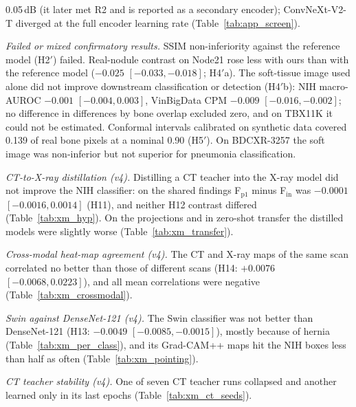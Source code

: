 \begin{description}
 0.05\,dB (it later met R2 and is reported as a secondary encoder); ConvNeXt-V2-T diverged at the full encoder learning rate
 (Table~\ref{tab:app_screen}).
\item[N9] \emph{Failed or mixed confirmatory results.}
 SSIM non-inferiority against the reference model (H2$'$) failed.
 Real-nodule contrast on Node21 rose less with ours than with the reference model ($-0.025$ $[-0.033,-0.018]$; H4$'$a).
 The soft-tissue image used alone did not improve downstream classification or detection (H4$'$b): NIH macro-AUROC $-0.001$
 $[-0.004,0.003]$, VinBigData CPM $-0.009$ $[-0.016,-0.002]$; no difference in differences by bone overlap excluded zero, and on TBX11K it could
 not be estimated.
 Conformal intervals calibrated on synthetic data covered 0.139 of real bone pixels at a nominal 0.90 (H5$'$).
 On BDCXR-3257 the soft image was non-inferior but not superior for pneumonia classification.
\item[N10] \emph{CT-to-X-ray distillation (v4).} Distilling a CT teacher into the X-ray model did not improve the NIH classifier: on the
 shared findings F$_\mathrm{p1}$ minus F$_\mathrm{in}$ was $-0.0001$ $[-0.0016,0.0014]$ (H11), and neither H12 contrast differed
 (Table~\ref{tab:xm_hyp}). On the projections and in zero-shot transfer the distilled models were slightly worse
 (Table~\ref{tab:xm_transfer}).
\item[N11] \emph{Cross-modal heat-map agreement (v4).} The CT and X-ray maps of the same scan correlated no better than those of different
 scans (H14: $+0.0076$ $[-0.0068,0.0223]$), and all mean correlations were negative (Table~\ref{tab:xm_crossmodal}).
\item[N12] \emph{Swin against DenseNet-121 (v4).} The Swin classifier was not better than DenseNet-121 (H13: $-0.0049$
 $[-0.0085,-0.0015]$), mostly because of hernia (Table~\ref{tab:xm_per_class}), and its Grad-CAM++ maps hit the NIH boxes less than half as
 often (Table~\ref{tab:xm_pointing}).
\item[N13] \emph{CT teacher stability (v4).} One of seven CT teacher runs collapsed and another learned only in its last epochs
 (Table~\ref{tab:xm_ct_seeds}).
\end{description}
